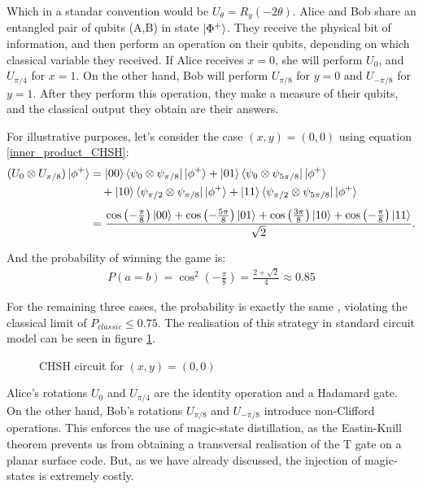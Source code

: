 \documentclass[12pt, twoside, openany]{book}
\begin{document}
Which in a standar convention would be $U_\theta = R_y(-2 \theta)$. Alice and Bob share an entangled pair of qubits (A,B) in state $\ket{\Phi^+}$. They receive the physical bit of information, and then perform an operation on their qubits, depending on which classical variable they received. If Alice receives $x=0$, she will perform $U_0$, and $U_{\pi/4}$ for $x=1$. On the other hand, Bob will perform $U_{\pi/8}$ for $y=0$ and $U_{-\pi/8}$ for $y=1$. After they perform this operation, they make a measure of their qubits, and the classical output they obtain are their answers. 

For illustrative purposes, let's consider the case $(x,y)=(0,0)$ using equation \ref{inner_product_CHSH}:
\begin{align*}
(U_0 \otimes U_{\pi/8}) \ket{\phi^+} &= \ket{00} \bra{\psi_0 \otimes \psi_{\pi/8}} \ket{\phi^+} + \ket{01} \bra{\psi_0 \otimes \psi_{5\pi/8}} \ket{\phi^+} \\
&\quad + \ket{10} \bra{\psi_{\pi/2} \otimes \psi_{\pi/8}} \ket{\phi^+} + \ket{11} \bra{\psi_{\pi/2} \otimes \psi_{5\pi/8}} \ket{\phi^+} \\[1ex]
&= \frac{\cos\left(-\frac{\pi}{8}\right)\ket{00} + \cos\left(-\frac{5\pi}{8}\right)\ket{01} + \cos\left(\frac{3\pi}{8}\right)\ket{10} + \cos\left(-\frac{\pi}{8}\right)\ket{11}}{\sqrt{2}}.
\end{align*}

And the probability of winning the game is:
\begin{align*}
    P(a=b)= \cos^2(-\frac{\pi}{8}) = \frac{2 + \sqrt{2}}{4} \approx 0.85
\end{align*}

For the remaining three cases, the probability is exactly the same \cite{watrous2025understandingquantuminformationcomputation}, violating the classical limit of $P_{classic} \leq 0.75$. The realisation of this strategy in standard circuit model can be seen in figure \ref{fig:CHSH_circuit}.

\begin{figure}[ht]
    \centering
    
    \caption{CHSH circuit for $(x,y) = (0,0)$}
    \label{fig:CHSH_circuit}
\end{figure}

Alice's rotations $U_0$ and $U_{\pi /4}$ are the identity operation and a Hadamard gate. On the other hand, Bob's rotations $U_{\pi/8}$ and $U_{-\pi/8}$ introduce non-Clifford operations. This enforces the use of magic-state distillation, as the Eastin-Knill theorem prevents us from obtaining a transversal realisation of the T gate on a planar surface code. But, as we have already discussed, the injection of magic-states is extremely costly.
\end{document}

